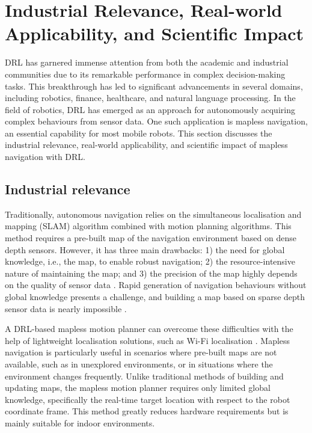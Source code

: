\newpage
\section{Industrial Relevance, Real-world Applicability, and Scientific Impact} \label{sec:impact}

DRL has garnered immense attention from both the academic and industrial communities due to its remarkable performance in complex decision-making tasks. This breakthrough has led to significant advancements in several domains, including robotics, finance, healthcare, and natural language processing. In the field of robotics, DRL has emerged as an approach for autonomously acquiring complex behaviours from sensor data. One such application is mapless navigation, an essential capability for most mobile robots. This section discusses the industrial relevance, real-world applicability, and scientific impact of mapless navigation with DRL.

\subsection{Industrial relevance}

Traditionally, autonomous navigation relies on the simultaneous localisation and mapping (SLAM) algorithm combined with motion planning algorithms. This method requires a pre-built map of the navigation environment based on dense depth sensors. However, it has three main drawbacks: 1) the need for global knowledge, i.e., the map, to enable robust navigation; 2) the resource-intensive nature of maintaining the map; and 3) the precision of the map highly depends on the quality of sensor data \cite{ref:virtual2real-drl}. Rapid generation of navigation behaviours without global knowledge presents a challenge, and building a map based on sparse depth sensor data is nearly impossible \cite{ref:virtual2real-drl}.

A DRL-based mapless motion planner can overcome these difficulties with the help of lightweight localisation solutions, such as Wi-Fi localisation \cite{ref:virtual2real-drl}. Mapless navigation is particularly useful in scenarios where pre-built maps are not available, such as in unexplored environments, or in situations where the environment changes frequently. Unlike traditional methods of building and updating maps, the mapless motion planner requires only limited global knowledge, specifically the real-time target location with respect to the robot coordinate frame. This method greatly reduces hardware requirements but is mainly suitable for indoor environments.

